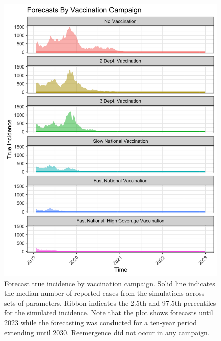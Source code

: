\documentclass[12pt]{article}
\begin{document}
\begin{figure}[H]
  \centering
  \includegraphics[width=150mm]{incid_plot.png}
  \caption{Forecast true incidence by vaccination campaign. Solid line indicates the median number of reported cases from the simulations across sets of parameters. Ribbon indicates the 2.5th and 97.5th percentiles for the simulated incidence. Note that the plot shows forecasts until 2023 while the forecasting was conducted for a ten-year period extending until 2030. Reemergence did not occur in any campaign.}
  \label{fig:A3}
\end{figure}
\end{document}
